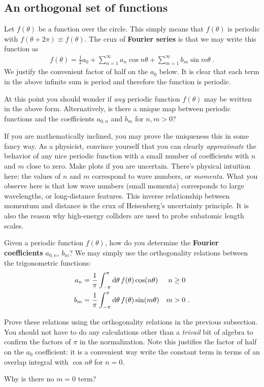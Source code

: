\documentclass[12pt, oneside]{report}    %
\begin{document}
\subsection{An orthogonal set of functions}

Let $f(\theta)$ be a function over the circle. This simply means that $f(\theta)$ is periodic with $f(\theta+2\pi) \equiv f(\theta)$. The crux of \textbf{Fourier series} is that we may write this function as
\begin{align}
    f(\theta) = \frac{1}{2}a_0
    + \sum_{n=1}^\infty a_n \cos n\theta
    + \sum_{m=1}^\infty b_m \sin m\theta \ .
    \label{eq:fourier:series:sine:cos}
\end{align}
We justify the convenient factor of half on the $a_0$ below. It is clear that each term in the above infinite sum is period and therefore the function is periodic.
\begin{exercise}[Completeness?] 
At this point you should wonder if \emph{any} periodic function $f(\theta)$ may be written in the above form. Alternatively, is there a unique map between periodic functions and the coefficients $a_{0,n}$ and $b_m$ for $n,m>0$? 

If you are mathematically inclined, you may prove the uniqueness this in some fancy way. As a physicist, convince yourself that you can clearly \emph{approximate} the behavior of any nice periodic function with a small number of coefficients with $n$ and $m$ close to zero. Make plots if you are uncertain. There's physical intuition here: the values of $n$ and $m$ correspond to wave numbers, or \emph{momenta}. What you observe here is that low wave numbers (small momenta) corresponds to large wavelengths, or long-distance features. This inverse relationship between momentum and distance is the crux of Heisenberg's uncertainty principle. It is also the reason why high-energy colliders are used to probe subatomic length scales.
\end{exercise}

Given a periodic function $f(\theta)$, how do you determine the \textbf{Fourier coefficients} $a_{0,n}$, $b_m$? We may simply use the orthogonality relations between the trigonometric functions:
\begin{align}
    a_n &= \frac{1}{\pi}\int_{-\pi}^\pi
    \operatorname{d}\!{\theta}\, f(\theta) \cos(n\theta) & n&\geq 0
    \\
    b_m &= \frac{1}{\pi}\int_{-\pi}^\pi
    \operatorname{d}\!{\theta}\, f(\theta) \sin(m\theta) 
    & m&> 0
    \ .
\end{align}
\begin{exercise}
Prove these relations using the orthogonality relations in the previous subsection. You should not have to do any calculations other than a \emph{trivail} bit of algebra to confirm the factors of $\pi$ in the normalization. Note this justifies the factor of half on the $a_0$ coefficient: it is a convenient way write the constant term in terms of an overlap integral with $\cos n\theta$ for $n=0$.
\end{exercise}
\begin{exercise}
Why is there no $m=0$ term? 
\end{exercise}
\end{document}
